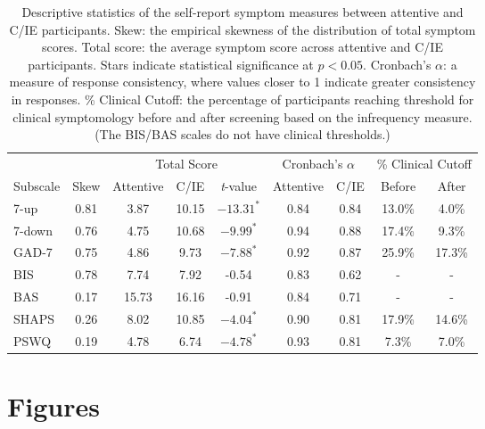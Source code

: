 \documentclass[a4paper,notitlepage,12pt]{article}
\begin{document}
\begin{refsection}[main]
\clearpage
\begin{table}[h]
    \centering
    \small
    \setlength{\tabcolsep}{6pt}
    \begin{tabular}{lcccccccc}
        \toprule
        & & \multicolumn{3}{c}{Total Score} & \multicolumn{2}{c}{Cronbach's $\alpha$} & \multicolumn{2}{c}{\% Clinical Cutoff} \\
        \cmidrule(lr){3-5} \cmidrule(lr){6-7} \cmidrule(lr){8-9}
         Subscale & Skew & Attentive & C/IE & \textit{t}-value & Attentive & C/IE & Before & After \\
        \midrule
        7-up   &  0.81 &    3.87 &   10.15 &  $-13.31^*$ &    0.84 &    0.84 &     13.0\% &       4.0\% \\
        7-down &  0.76 &    4.75 &   10.68 &   $-9.99^*$ &    0.94 &    0.88 &     17.4\% &       9.3\% \\
        GAD-7  &  0.75 &    4.86 &    9.73 &   $-7.88^*$ &    0.92 &    0.87 &     25.9\% &      17.3\% \\
        BIS    &  0.78 &    7.74 &    7.92 &   -0.54 &    0.83 &    0.62 &        - &             - \\
        BAS    &  0.17 &   15.73 &   16.16 &   -0.91 &    0.84 &    0.71 &        - &             - \\
        SHAPS  &  0.26 &    8.02 &   10.85 &   $-4.04^*$ &    0.90 &    0.81 &     17.9\% &      14.6\% \\
        PSWQ   &  0.19 &    4.78 &    6.74 &   $-4.78^*$ &    0.93 &    0.81 &      7.3\% &       7.0\% \\
        \bottomrule
    \end{tabular}
    \captionsetup{width=0.88\textwidth}
    \caption{Descriptive statistics of the self-report symptom measures between attentive and C/IE participants. Skew: the empirical skewness of the distribution of total symptom scores. Total score: the average symptom score across attentive and C/IE participants. Stars indicate statistical significance at $p<0.05$. Cronbach's $\alpha$: a measure of response consistency, where values closer to 1 indicate greater consistency in responses. \% Clinical Cutoff: the percentage of participants reaching threshold for clinical symptomology before and after screening based on the infrequency measure. (The BIS/BAS scales do not have clinical thresholds.)}
    \label{tab:validation}
\end{table}

\clearpage
\section*{Figures}


\end{refsection}
\end{document}

